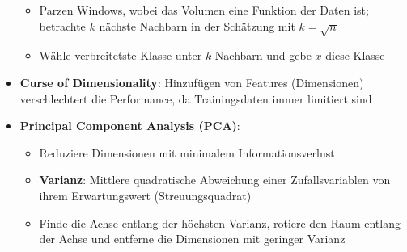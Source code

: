 \begin{itemize}
\begin{itemize}
		\item Parzen Windows, wobei das Volumen eine Funktion der Daten ist; betrachte $k$ nächste Nachbarn in der Schätzung mit $k = \sqrt{n}$
		\item Wähle verbreitetste Klasse unter $k$ Nachbarn und gebe $x$ diese Klasse
	\end{itemize}
	\item \textbf{Curse of Dimensionality}: Hinzufügen von Features (Dimensionen) verschlechtert die Performance, da Trainingsdaten immer limitiert sind
	\item \textbf{Principal Component Analysis (PCA)}:
	\begin{itemize}
		\item Reduziere Dimensionen mit minimalem Informationsverlust
		\item \textbf{Varianz}: Mittlere quadratische Abweichung einer Zufallsvariablen von ihrem Erwartungswert (Streuungsquadrat)
		\item Finde die Achse entlang der höchsten Varianz, rotiere den Raum entlang der Achse und entferne die Dimensionen mit geringer Varianz
	\end{itemize}
\end{itemize}
